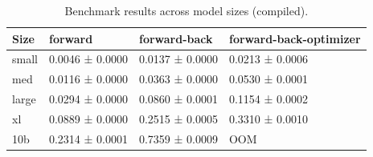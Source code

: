 \begin{table}
\caption{Benchmark results across model sizes (compiled).}
\label{tab:compiled-model-benchmark-results}
\begin{tabular}{llll}
\toprule
Size & forward & forward-back & forward-back-optimizer \\
\midrule
small & 0.0046 ± 0.0000 & 0.0137 ± 0.0000 & 0.0213 ± 0.0006 \\
med & 0.0116 ± 0.0000 & 0.0363 ± 0.0000 & 0.0530 ± 0.0001 \\
large & 0.0294 ± 0.0000 & 0.0860 ± 0.0001 & 0.1154 ± 0.0002 \\
xl & 0.0889 ± 0.0000 & 0.2515 ± 0.0005 & 0.3310 ± 0.0010 \\
10b & 0.2314 ± 0.0001 & 0.7359 ± 0.0009 & OOM \\
\bottomrule
\end{tabular}
\end{table}
